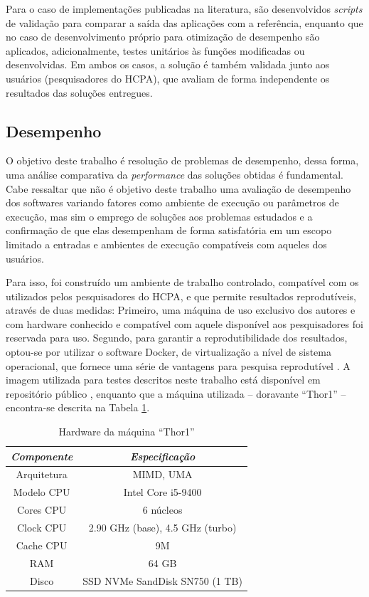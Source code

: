 \documentclass[cic,tc]{iiufrgs}
\begin{document}
Para o caso de implementações publicadas na literatura, são desenvolvidos
\textit{scripts} de validação para comparar a saída das aplicações com a
referência, enquanto que no caso de desenvolvimento próprio para otimização de
desempenho são aplicados, adicionalmente, testes unitários às funções
modificadas ou desenvolvidas. Em ambos os casos, a solução é também validada
junto aos usuários (pesquisadores do HCPA), que avaliam de forma independente
os resultados das soluções entregues.

\subsection{Desempenho}
\label{sec:perfmethod}

O objetivo deste trabalho é resolução de problemas de desempenho, dessa forma,
uma análise comparativa da \textit{performance} das soluções obtidas é
fundamental. Cabe ressaltar que não é objetivo deste trabalho uma avaliação de
desempenho dos softwares variando fatores como ambiente de execução ou
parâmetros de execução, mas sim o emprego de soluções aos problemas estudados e
a confirmação de que elas desempenham de forma satisfatória em um escopo
limitado a entradas e ambientes de execução compatíveis com aqueles dos
usuários.

Para isso, foi construído um ambiente de trabalho controlado, compatível com os
utilizados pelos pesquisadores do HCPA, e que permite resultados reprodutíveis,
através de duas medidas: Primeiro, uma máquina de uso exclusivo dos autores e
com hardware conhecido e compatível com aquele disponível aos
pesquisadores foi reservada para uso. Segundo, para garantir a
reprodutibilidade dos resultados, optou-se por utilizar o software
Docker, de virtualização a nível de sistema operacional, que fornece uma série
de vantagens para pesquisa reprodutível \cite{boettiger2015introduction}. A
imagem utilizada para testes descritos neste trabalho está disponível em
repositório público \cite{dockerme}, enquanto que a máquina utilizada --
doravante ``Thor1'' -- encontra-se descrita na Tabela \ref{tbl:thor1}.

\begin{table}[h]
    \caption{Hardware da máquina ``Thor1''}
    \centering
        \begin{tabular}{c|c}
          \hline
          \textit{Componente}  &   \textit{Especificação} \\
          \hline
          \hline
          Arquitetura & MIMD, UMA \\
          Modelo CPU & Intel Core i5-9400 \\
          Cores CPU & 6 núcleos\\
          Clock CPU & 2.90 GHz (base), 4.5 GHz (turbo) \\
          Cache CPU & 9M \\
          RAM & 64 GB \\
          Disco & SSD NVMe SandDisk SN750 (1 TB) \\
          \hline
        \end{tabular}
    \label{tbl:thor1}
\end{table}
\end{document}
